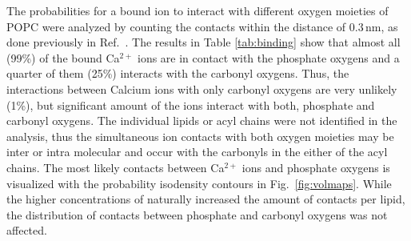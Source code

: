 \documentclass[aip,jcp,twocolumn]{revtex4}
\begin{document}
The probabilities for a bound  ion to interact with
different oxygen moieties of POPC 
were analyzed by counting the contacts within the distance of $0.3 \, \mathrm{nm}$, 
as done previously in Ref.~. 
%
%
%
The results in Table \ref{tab:binding} show that almost all (99\%) of the 
bound Ca$^{2+}$ ions are in contact with the phosphate oxygens and a quarter
of them (25\%) interacts with the carbonyl oxygens. Thus, the interactions between
Calcium ions with only carbonyl oxygens are very unlikely (1\%), but significant
amount of the ions interact with both, phosphate and carbonyl oxygens.
The individual lipids or acyl chains were not identified in the analysis,
thus the simultaneous ion contacts with both oxygen moieties may be inter or intra molecular
and occur with the carbonyls in the either of the acyl chains.
The most likely contacts between Ca$^{2+}$ ions and phosphate oxygens is visualized with
the probability isodensity contours in Fig.~\ref{fig:volmaps}.
While the higher concentrations of  naturally increased the amount of contacts per lipid,
the distribution of contacts between phosphate and carbonyl oxygens was not affected.
\end{document}
